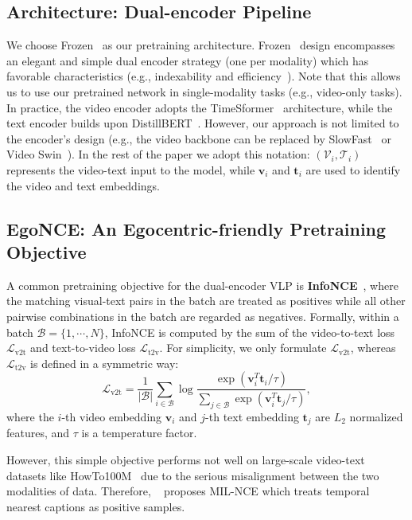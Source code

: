 \documentclass{article}
\newcommand{\howto}{HowTo100M}
\begin{document}
\subsection{Architecture: Dual-encoder Pipeline}
We choose Frozen~\cite{bain2021frozen} as our pretraining architecture. Frozen~\cite{bain2021frozen} design encompasses an elegant and simple dual encoder strategy (one per modality) which has favorable characteristics (e.g., indexability and efficiency~\cite{escorcia2019temporal,miech2021thinking}). Note that this allows us to use our pretrained network in single-modality tasks (e.g., video-only tasks). In practice, the video encoder adopts the TimeSformer~\cite{timesformer} architecture, while the text encoder builds upon DistillBERT~\cite{distilbert}. However, our approach is not limited to the encoder's design (e.g., the video backbone can be replaced by SlowFast~\cite{slowfast} or Video Swin~\cite{liu2022video}). 
In the rest of the paper we adopt this notation: $(\mathcal{V}_i, \mathcal{T}_i)$ represents the video-text input to the model, while $\mathbf{v}_i$ and $\mathbf{t}_i$ are used to identify the video and text embeddings.

\subsection{EgoNCE: An Egocentric-friendly Pretraining Objective}
A common pretraining objective for the dual-encoder VLP is \textbf{InfoNCE}~\cite{infonce}, where the matching visual-text pairs in the batch are treated as positives while all other pairwise combinations in the batch are regarded as negatives. 
Formally, within a batch $\mathcal{B}=\{1,\cdots, N\}$, InfoNCE is computed by the sum of the video-to-text loss $\mathcal{L}_\text{v2t}$ and text-to-video loss $\mathcal{L}_\text{t2v}$.
For simplicity, we only formulate $\mathcal{L}_\text{v2t}$, whereas $\mathcal{L}_\text{t2v}$ is defined in a symmetric way:
\begin{equation}
\mathcal{L}_\text{v2t}=\frac{1}{|\mathcal{B}|}\sum_{i\in \mathcal{B}} \log \frac{\exp(\mathbf{v}_i^T\mathbf{t}_i /\tau)}{\sum_{j\in \mathcal{B}} \exp( \mathbf{v}_i^T\mathbf{t}_j /\tau)},
\label{nce}
\end{equation}
where the $i$-th video embedding $\mathbf{v}_i$ and $j$-th text embedding $\mathbf{t}_j$ are $L_2$ normalized features, and $\tau$ is a temperature factor.

However, this simple objective performs not well on large-scale video-text datasets like \howto~\cite{miech2019howto100m} due to the serious misalignment between the two modalities of data.
Therefore, ~\cite{mil_nce} proposes MIL-NCE which treats temporal nearest captions as positive samples. 
\end{document}
